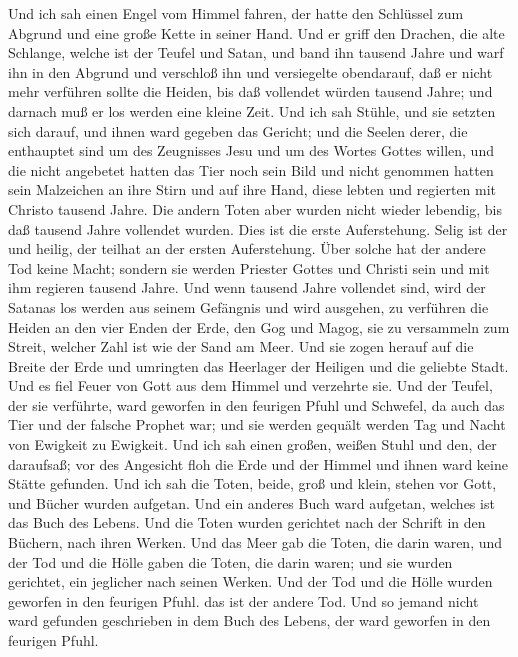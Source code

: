  Und ich sah einen Engel vom Himmel fahren, der hatte den
Schlüssel zum Abgrund und eine große Kette in seiner Hand. 
Und er griff den Drachen, die alte Schlange, welche ist der Teufel und
Satan, und band ihn tausend Jahre  und warf ihn in den
Abgrund und verschloß ihn und versiegelte obendarauf, daß er nicht mehr
verführen sollte die Heiden, bis daß vollendet würden tausend Jahre; und
darnach muß er los werden eine kleine Zeit.  Und ich sah
Stühle, und sie setzten sich darauf, und ihnen ward gegeben das Gericht;
und die Seelen derer, die enthauptet sind um des Zeugnisses Jesu und um
des Wortes Gottes willen, und die nicht angebetet hatten das Tier noch
sein Bild und nicht genommen hatten sein Malzeichen an ihre Stirn und
auf ihre Hand, diese lebten und regierten mit Christo tausend Jahre.
 Die andern Toten aber wurden nicht wieder lebendig, bis daß
tausend Jahre vollendet wurden. Dies ist die erste Auferstehung.
 Selig ist der und heilig, der teilhat an der ersten
Auferstehung. Über solche hat der andere Tod keine Macht; sondern sie
werden Priester Gottes und Christi sein und mit ihm regieren tausend
Jahre.  Und wenn tausend Jahre vollendet sind, wird der
Satanas los werden aus seinem Gefängnis  und wird ausgehen,
zu verführen die Heiden an den vier Enden der Erde, den Gog und Magog,
sie zu versammeln zum Streit, welcher Zahl ist wie der Sand am Meer.
 Und sie zogen herauf auf die Breite der Erde und umringten
das Heerlager der Heiligen und die geliebte Stadt. Und es fiel Feuer von
Gott aus dem Himmel und verzehrte sie.  Und der Teufel, der
sie verführte, ward geworfen in den feurigen Pfuhl und Schwefel, da auch
das Tier und der falsche Prophet war; und sie werden gequält werden Tag
und Nacht von Ewigkeit zu Ewigkeit.  Und ich sah einen
großen, weißen Stuhl und den, der daraufsaß; vor des Angesicht floh die
Erde und der Himmel und ihnen ward keine Stätte gefunden. 
Und ich sah die Toten, beide, groß und klein, stehen vor Gott, und
Bücher wurden aufgetan. Und ein anderes Buch ward aufgetan, welches ist
das Buch des Lebens. Und die Toten wurden gerichtet nach der Schrift in
den Büchern, nach ihren Werken.  Und das Meer gab die
Toten, die darin waren, und der Tod und die Hölle gaben die Toten, die
darin waren; und sie wurden gerichtet, ein jeglicher nach seinen Werken.
 Und der Tod und die Hölle wurden geworfen in den feurigen
Pfuhl. das ist der andere Tod.  Und so jemand nicht ward
gefunden geschrieben in dem Buch des Lebens, der ward geworfen in den
feurigen Pfuhl.

